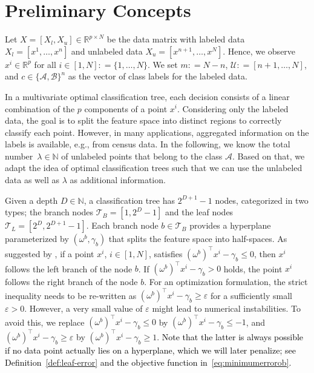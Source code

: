 \documentclass[a4paper,american,reqno]{amsart}
\newcommand{\define}{\mathrel{{\mathop:}{=}}}
\newcommand{\set}[1]{\{#1\}}
\newcommand{\field}{\mathbb}
\newcommand{\naturals}{\field{N}}
\newcommand{\reals}{\field{R}}
\newcommand{\N}{\naturals}
\newcommand{\R}{\reals}
\newcommand{\rev}[1]{#1}
\newcommand{\revTwo}[1]{\textcolor{black}{#1}}
\begin{document}

\section{Preliminary Concepts}
\label{sec:chapter-1}

Let $\rev{X = [X_l, X_u]} \in \R^{p \times N}$ be the data matrix with
labeled data $X_l = [x^1, \dotsc, x^{n}]$ and unlabeled data $X_u =
[x^{n+1}, \dotsc, x^N]$.
Hence, we observe $x^i \in \mathbb{R}^p$ for all $i \in [1,N]
\define \set{1,\dots, N}$.
We set $m \define N -n $, $\mathcal{U}\define [n+1,\dots, N]$, and
$c \in \set{\mathcal{A},\mathcal{B}}^{n}$ as the vector of class
labels for the labeled data.

In a multivariate optimal classification tree, each decision consists
of a linear combination of the $p$ components of a point $x^i$.
Considering only the labeled data, the goal is to split the feature
space into distinct regions to correctly classify each point.
However, in many applications, aggregated information on the labels
is available, e.g., from census data.
\rev{In the following, we know the total number~$\lambda \in \N$ of
  unlabeled points that belong to the class $\mathcal{A}$.
  Based on that, we adapt the idea of optimal classification trees such
  that we can use the unlabeled data as well as $\lambda$ as additional
  information.}

Given a depth $D \in \mathbb{N}$, a classification tree has
$2^{D+1}-1$ nodes, categorized in two types; the branch nodes
$\mathcal{T}_B = [1, 2^D - 1]$ and the leaf nodes $\mathcal{T}_L =
[2^D, 2^{D+1}-1]$.
Each branch node $b \in \mathcal{T}_B$ provides a hyperplane
parameterized by $(\omega^b, \gamma_b)$ that splits the feature
space into half-spaces.
As suggested by \textcite{Bertsimas2017},  if a point $x^i$, $i \in
[1,N]$, satisfies $(\omega^b)^\top x^i - \gamma_b \leq 0$,  then
$x^i$ follows the left branch of the node $b$.
If $(\omega^b)^\top x^i - \gamma_b > 0$ holds, the point $x^i$ follows
the right branch of the node $b$.
For an optimization formulation, the strict inequality needs
to be re-written as $(\omega^b)^\top x^i - \gamma_b \geq \varepsilon$
for a sufficiently small $\varepsilon > 0$.
However, a very small value of $\varepsilon$ might lead to numerical
instabilities.
To avoid this, we replace $(\omega^b)^\top x^i - \gamma_b \leq 0$ by
$(\omega^b)^\top x^i - \gamma_b \leq -1$, and $(\omega^b)^\top x^i -
\gamma_b \geq \varepsilon$ by $(\omega^b)^\top x^i - \gamma_b \geq
1$.
\revTwo{Note that the latter is always possible if no data point actually
  lies on a hyperplane, which we will later penalize; see
  Definition~\ref{def:leaf-error} and the objective function
  in~\eqref{eq:minimumerrorob}.}
\end{document}

